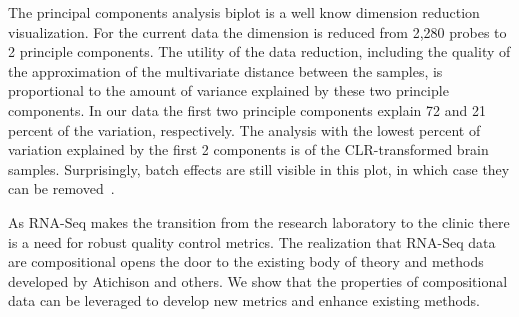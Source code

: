 The principal components analysis biplot is a well know dimension reduction visualization.  For the current data the dimension is reduced from 2,280 probes to 2 principle components.  The utility of the data reduction, including the quality of the approximation of the multivariate distance between the samples, is proportional to the amount of variance explained by these two principle components. In our data the first two principle components explain 72 and 21 percent of the variation, respectively.  The analysis with the lowest percent of variation explained by the first 2 components is of the CLR-transformed brain samples.  Surprisingly, batch effects are still visible in this plot, in which case they can be removed~\cite{Luo2010}.  

As RNA-Seq makes the transition from the research laboratory to the clinic there is a need for robust quality control metrics.  The realization that RNA-Seq data are compositional opens the door to the existing body of theory and methods developed by Atichison and others.  We show that the properties of compositional data can be leveraged to develop new metrics and enhance existing methods.\\



\newpage
 


















